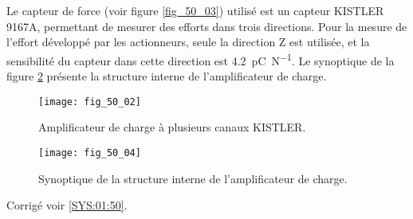 Le capteur de force (voir figure \ref{fig_50_03}) utilisé est un capteur KISTLER 9167A, permettant
de mesurer des efforts dans trois directions. Pour la mesure de l’effort développé par
les actionneurs, seule la direction Z est utilisée, et la sensibilité du capteur dans cette
direction est \SI{4,2}{pC.N^{-1}}.
Le synoptique de la figure \ref{fig_50_04} présente la structure interne de l’amplificateur de charge.

\begin{figure}[H]
\centering
\texttt{[image: fig\_50\_02]}
\caption{Amplificateur de charge à plusieurs canaux KISTLER. \label{fig_50_02}}
\end{figure}



\begin{figure}[H]
\centering
\texttt{[image: fig\_50\_04]}
\caption{Synoptique de la structure interne de l’amplificateur de charge. \label{fig_50_04}}
\end{figure}
\fi

\ifprof
\else
\fi

\ifprof
\else
\fi

\ifprof
\else
\fi




\ifprof
\else
\begin{flushright}
\footnotesize{Corrigé  voir \ref{SYS:01:50}.}
\end{flushright}%
\fi